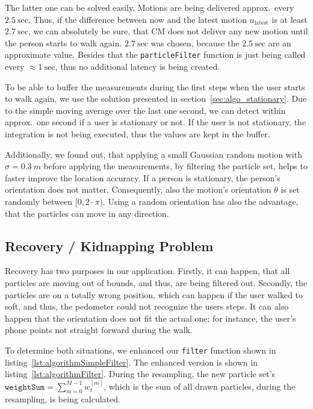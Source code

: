 The latter one can be solved easily. Motions are being delivered approx.\ every $2.5~\text{sec}$. Thus, if the difference between now and the latest motion $u_\text{latest}$ is at least $2.7~\text{sec}$, we can absolutely be sure, that \acs{CM} does not deliver any new motion until the person starts to walk again. $2.7~\text{sec}$ was chosen, because the $2.5~\text{sec}$ are an approximate value. Besides that the \texttt{particleFilter} function is just being called every $\approx 1~\text{sec}$, thus no additional latency is being created.

To be able to buffer the measurements during the first steps when the user starts to walk again, we use the solution presented in section~\ref{sec:algo_stationary}. Due to the simple moving average over the last one second, we can detect within approx.\ one second if a user is stationary or not. If the user is not stationary, the integration is not being executed, thus the values are kept in the buffer.

Additionally, we found out, that applying a small Gaussian random motion with $\sigma = 0.3~m$ before applying the measurements, by filtering the particle set, helps to faster improve the location accuracy. If a person is stationary, the person's orientation does not matter. Consequently, also the motion's orientation $\theta$ is set randomly between $[0, 2 \cdot \pi)$. Using a random orientation has also the advantage, that the particles can move in any direction.




\subsection{Recovery / Kidnapping Problem}\label{sec:algo_recovery}
Recovery has two purposes in our application. Firstly, it can happen, that all particles are moving out of bounds, and thus, are being filtered out. Secondly, the particles are on a totally wrong position, which can happen if the user walked to soft, and thus, the pedometer could not recognize the users steps. It can also happen that the orientation does not fit the actual one; for instance, the user's phone points not straight forward during the walk.

To determine both situations, we enhanced our \texttt{filter} function shown in listing~\ref{lst:algorithmSimpleFilter}. The enhanced version is shown in listing~\ref{lst:algorithmFilter}. During the resampling, the new particle set's $\texttt{weightSum} = \sum_{m = 0}^{M-1} w^{[m]}_t$, which is the sum of all drawn particles, during the resampling, is being calculated.

